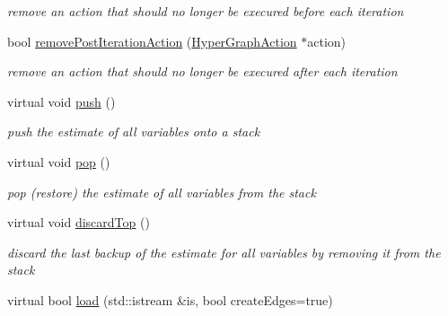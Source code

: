 \begin{DoxyCompactItemize}
\begin{DoxyCompactList}\small\item\em remove an action that should no longer be execured before each iteration \end{DoxyCompactList}\item 
\hypertarget{structg2o_1_1OptimizableGraph_a172f2f5c8ec5872d5bc34077c6391839}{bool \hyperlink{structg2o_1_1OptimizableGraph_a172f2f5c8ec5872d5bc34077c6391839}{remove\-Post\-Iteration\-Action} (\hyperlink{classg2o_1_1HyperGraphAction}{Hyper\-Graph\-Action} $\ast$action)}\label{structg2o_1_1OptimizableGraph_a172f2f5c8ec5872d5bc34077c6391839}

\begin{DoxyCompactList}\small\item\em remove an action that should no longer be execured after each iteration \end{DoxyCompactList}\item 
\hypertarget{structg2o_1_1OptimizableGraph_a3db385b25818a5659d1fa8407cb0db45}{virtual void \hyperlink{structg2o_1_1OptimizableGraph_a3db385b25818a5659d1fa8407cb0db45}{push} ()}\label{structg2o_1_1OptimizableGraph_a3db385b25818a5659d1fa8407cb0db45}

\begin{DoxyCompactList}\small\item\em push the estimate of all variables onto a stack \end{DoxyCompactList}\item 
\hypertarget{structg2o_1_1OptimizableGraph_a8487f537b16ac7a2ee416ea294a1e22e}{virtual void \hyperlink{structg2o_1_1OptimizableGraph_a8487f537b16ac7a2ee416ea294a1e22e}{pop} ()}\label{structg2o_1_1OptimizableGraph_a8487f537b16ac7a2ee416ea294a1e22e}

\begin{DoxyCompactList}\small\item\em pop (restore) the estimate of all variables from the stack \end{DoxyCompactList}\item 
\hypertarget{structg2o_1_1OptimizableGraph_a368b5f22dbc57abd2f651a20d039f61c}{virtual void \hyperlink{structg2o_1_1OptimizableGraph_a368b5f22dbc57abd2f651a20d039f61c}{discard\-Top} ()}\label{structg2o_1_1OptimizableGraph_a368b5f22dbc57abd2f651a20d039f61c}

\begin{DoxyCompactList}\small\item\em discard the last backup of the estimate for all variables by removing it from the stack \end{DoxyCompactList}\item 
\hypertarget{structg2o_1_1OptimizableGraph_a34f4a170d58551ee9efac7a7a78fa833}{virtual bool \hyperlink{structg2o_1_1OptimizableGraph_a34f4a170d58551ee9efac7a7a78fa833}{load} (std\-::istream \&is, bool create\-Edges=true)}\label{structg2o_1_1OptimizableGraph_a34f4a170d58551ee9efac7a7a78fa833}


\end{DoxyCompactItemize}
